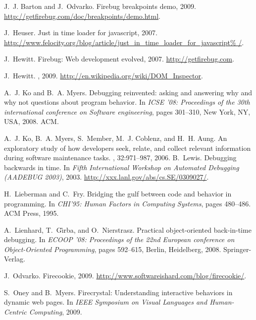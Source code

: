 \documentclass{www2010-accepted}
\begin{document}
\begin{thebibliography}{10}

J.~J. Barton and J.~Odvarko.
\newblock Firebug breakpoints demo, 2009.
\newblock \url{http://getfirebug.com/doc/breakpoints/demo.html}.

J.~Heuser.
\newblock Just in time loader for javascript, 2007.
\newblock
  \url{http://www.felocity.org/blog/article/just_in_time_loader_for_javascript%
/}.

J.~Hewitt.
\newblock Firebug: Web development evolved, 2007.
\newblock \url{http://getfirebug.com}.

J.~Hewitt.
, 2009.
\newblock \url{http://en.wikipedia.org/wiki/DOM_Inspector}.

A.~J. Ko and B.~A. Myers.
\newblock Debugging reinvented: asking and answering why and why not questions
  about program behavior.
\newblock In {\em ICSE '08: Proceedings of the 30th international conference on
  Software engineering}, pages 301--310, New York, NY, USA, 2008. ACM.

A.~J. Ko, B.~A. Myers, S.~Member, M.~J. Coblenz, and H.~H. Aung.
\newblock An exploratory study of how developers seek, relate, and collect
  relevant information during software maintenance tasks.
, 32:971--987, 2006.
\vfill\eject
{}
B.~Lewis.
\newblock Debugging backwards in time.
\newblock In {\em Fifth International Workshop on Automated Debugging (AADEBUG
  2003)}, 2003.
\newblock \url{http://xxx.lanl.gov/abs/cs.SE/0309027/}.

H.~Lieberman and C.~Fry.
\newblock Bridging the gulf between code and behavior in programming.
\newblock In {\em CHI'95: Human Factors in Computing Systems}, pages 480--486.
  ACM Press, 1995.

A.~Lienhard, T.~G\^{\i}rba, and O.~Nierstrasz.
\newblock Practical object-oriented back-in-time debugging.
\newblock In {\em ECOOP '08: Proceedings of the 22nd European conference on
  Object-Oriented Programming}, pages 592--615, Berlin, Heidelberg, 2008.
  Springer-Verlag.

J.~Odvarko.
\newblock Firecookie, 2009.
\newblock \url{http://www.softwareishard.com/blog/firecookie/}.

S.~Oney and B.~Myers.
\newblock Firecrystal: Understanding interactive behaviors in dynamic web
  pages.
\newblock In {\em IEEE Symposium on Visual Languages and Human-Centric
  Computing}, 2009.


\end{thebibliography}
\end{document}
